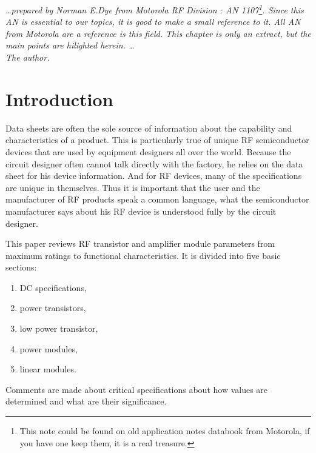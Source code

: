 %
%
%
%

\textit{\ldots prepared by Norman E.Dye from Motorola RF Division : AN 1107\footnote{This note could be found on old application notes databook from Motorola, if you have one keep them, it is a real treasure.}. Since this AN is essential to our topics, it is good to make a small reference to it. All AN from Motorola are a reference is this field. This chapter is only an extract, but the main points are hilighted herein.  \ldots \\ The author.}

\section{Introduction}
Data sheets are often the sole source of information about the
capability and characteristics of a product. This is particularly true
of unique RF semiconductor devices that are used by equipment
designers all over the world. Because the circuit designer often
cannot talk directly with the factory, he relies on the data sheet for
his device information. And for RF devices, many of the specifications
are unique in themselves. Thus it is important that the user and the
manufacturer of RF products speak a common language, what the
semiconductor manufacturer says about his RF device is understood
fully by the circuit designer.

\bigskip 

This paper reviews RF transistor and amplifier module parameters from
maximum ratings to functional characteristics.  It is divided into
five basic sections:

\begin{enumerate}
\item DC specifications,
\item power transistors,
\item low power transistor,
\item power modules,
\item linear modules.
\end{enumerate} 

Comments are made about critical specifications about how values are
determined and what are their significance.

